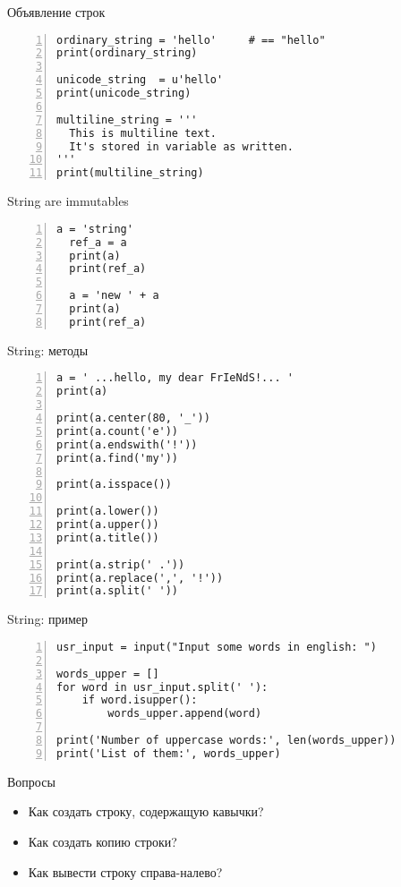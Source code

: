 \documentclass[hyperref={pdftex,unicode}]{beamer}
\begin{document}
\begin{frame}[fragile]{Объявление строк}
\begin{lstlisting}[basicstyle=\footnotesize\ttfamily,numbers=left]
ordinary_string = 'hello'     # == "hello"
print(ordinary_string)

unicode_string  = u'hello'
print(unicode_string)

multiline_string = '''
  This is multiline text.
  It's stored in variable as written.
'''
print(multiline_string)
\end{lstlisting}
\end{frame}

\begin{frame}[fragile]{String are immutables}
\begin{lstlisting}[basicstyle=\footnotesize\ttfamily,numbers=left]
  a = 'string'
  ref_a = a
  print(a)
  print(ref_a)

  a = 'new ' + a
  print(a)
  print(ref_a)
\end{lstlisting}
\end{frame}

\begin{frame}[fragile]{String: методы}
\begin{lstlisting}[basicstyle=\footnotesize\ttfamily,numbers=left]
a = ' ...hello, my dear FrIeNdS!... '
print(a)

print(a.center(80, '_'))
print(a.count('e'))
print(a.endswith('!'))
print(a.find('my'))

print(a.isspace())

print(a.lower())
print(a.upper())
print(a.title())

print(a.strip(' .'))
print(a.replace(',', '!'))
print(a.split(' '))
\end{lstlisting}
\end{frame}

\begin{frame}[fragile]{String: пример}
\begin{lstlisting}[basicstyle=\footnotesize\ttfamily,numbers=left]
usr_input = input("Input some words in english: ")

words_upper = []
for word in usr_input.split(' '):
    if word.isupper():
        words_upper.append(word)

print('Number of uppercase words:', len(words_upper))
print('List of them:', words_upper)
\end{lstlisting}
\end{frame}

\begin{frame}{Вопросы}
  \begin{itemize}
  \item Как создать строку, содержащую кавычки?
  \item Как создать копию строки?
  \item Как вывести строку справа-налево?
  \end{itemize}
\end{frame}
\end{document}
